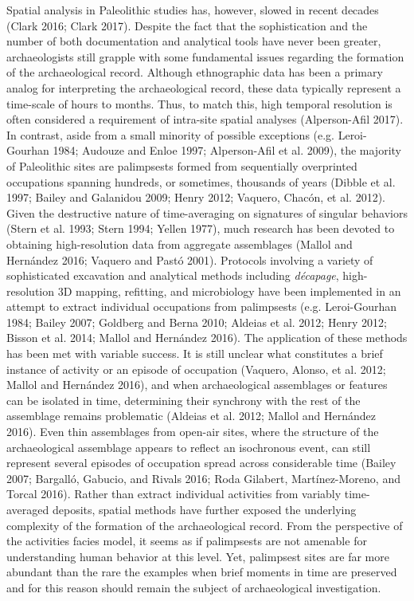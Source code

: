\documentclass[smallextended]{svjour3}       %
\begin{document}
Spatial analysis in Paleolithic studies has, however, slowed in recent
decades (Clark 2016; Clark 2017). Despite the fact that the
sophistication and the number of both documentation and analytical tools
have never been greater, archaeologists still grapple with some
fundamental issues regarding the formation of the archaeological record.
Although ethnographic data has been a primary analog for interpreting
the archaeological record, these data typically represent a time-scale
of hours to months. Thus, to match this, high temporal resolution is
often considered a requirement of intra-site spatial analyses
(Alperson-Afil 2017). In contrast, aside from a small minority of
possible exceptions (e.g. Leroi-Gourhan 1984; Audouze and Enloe 1997;
Alperson-Afil et al. 2009), the majority of Paleolithic sites are
palimpsests formed from sequentially overprinted occupations spanning
hundreds, or sometimes, thousands of years (Dibble et al. 1997; Bailey
and Galanidou 2009; Henry 2012; Vaquero, Chacón, et al. 2012). Given the
destructive nature of time-averaging on signatures of singular behaviors
(Stern et al. 1993; Stern 1994; Yellen 1977), much research has been
devoted to obtaining high-resolution data from aggregate assemblages
(Mallol and Hernández 2016; Vaquero and Pastó 2001). Protocols involving
a variety of sophisticated excavation and analytical methods including
\emph{décapage}, high-resolution 3D mapping, refitting, and microbiology
have been implemented in an attempt to extract individual occupations
from palimpsests (e.g. Leroi-Gourhan 1984; Bailey 2007; Goldberg and
Berna 2010; Aldeias et al. 2012; Henry 2012; Bisson et al. 2014; Mallol
and Hernández 2016). The application of these methods has been met with
variable success. It is still unclear what constitutes a brief instance
of activity or an episode of occupation (Vaquero, Alonso, et al. 2012;
Mallol and Hernández 2016), and when archaeological assemblages or
features can be isolated in time, determining their synchrony with the
rest of the assemblage remains problematic (Aldeias et al. 2012; Mallol
and Hernández 2016). Even thin assemblages from open-air sites, where
the structure of the archaeological assemblage appears to reflect an
isochronous event, can still represent several episodes of occupation
spread across considerable time (Bailey 2007; Bargalló, Gabucio, and
Rivals 2016; Roda Gilabert, Martínez-Moreno, and Torcal 2016). Rather
than extract individual activities from variably time-averaged deposits,
spatial methods have further exposed the underlying complexity of the
formation of the archaeological record. From the perspective of the
activities facies model, it seems as if palimpsests are not amenable for
understanding human behavior at this level. Yet, palimpsest sites are
far more abundant than the rare the examples when brief moments in time
are preserved and for this reason should remain the subject of
archaeological investigation.
\end{document}
